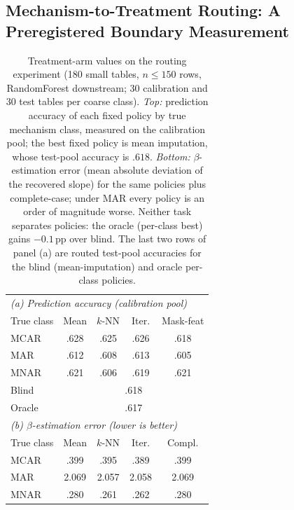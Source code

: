 \documentclass[conference]{IEEEtran}
\begin{document}
\subsection{Mechanism-to-Treatment Routing: A Preregistered Boundary Measurement}\label{sec:e3b}

\begin{table}[t]
\caption{Treatment-arm values on the routing experiment (180 small tables, $n\le150$ rows,
RandomForest downstream; 30 calibration and 30 test tables per coarse class).
\emph{Top:} prediction accuracy of each fixed policy by true mechanism class, measured on the
calibration pool; the best fixed policy is mean imputation, whose test-pool accuracy is $.618$.
\emph{Bottom:} $\beta$-estimation error (mean absolute deviation of the recovered slope) for the
same policies plus complete-case; under MAR every policy is an order of magnitude worse. Neither
task separates policies: the oracle (per-class best) gains $-0.1$\,pp over blind. The last two
rows of panel (a) are routed test-pool accuracies for the blind (mean-imputation) and oracle
per-class policies.}
\label{tab:vtable}
\centering\small
\begin{tabular}{lcccc}
\toprule
\multicolumn{5}{l}{\emph{(a) Prediction accuracy (calibration pool)}}\\
True class & Mean & $k$-NN & Iter. & Mask-feat \\
\midrule
MCAR & .628 & .625 & .626 & .618 \\
MAR  & .612 & .608 & .613 & .605 \\
MNAR & .621 & .606 & .619 & .621 \\
\midrule
Blind & \multicolumn{4}{c}{.618} \\
Oracle & \multicolumn{4}{c}{.617} \\
\midrule
\multicolumn{5}{l}{\emph{(b) $\beta$-estimation error (lower is better)}}\\
True class & Mean & $k$-NN & Iter. & Compl. \\
\midrule
MCAR & .399 & .395 & .389 & .399 \\
MAR  & 2.069 & 2.057 & 2.058 & 2.069 \\
MNAR & .280 & .261 & .262 & .280 \\
\bottomrule
\end{tabular}
\end{table}
\end{document}
